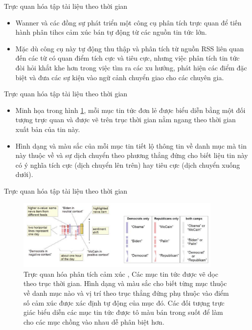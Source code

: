 \documentclass[10pt]{beamer}
\theoremstyle{remark}
\theoremstyle{definition}
\begin{document}
\begin{frame}{Trực quan hóa tập tài liệu theo thời gian}
	\begin{itemize}
		\item Wanner và các đồng sự phát triển một công cụ phân tích trực quan để tiến hành phân tihcs cảm xúc bán tự động từ các nguồn tin tức lớn.
		\item Mặc dù công cụ này tự động thu thập và phân tích từ nguồn RSS liên quan đến các từ có quan điểm tích cực và tiêu cực, nhưng việc phân tích tin tức đòi hỏi khắt khe hơn trong việc tìm ra các xu hướng, phát hiện các điểm đặc biệt và đưa các sự kiện vào ngữ cảnh chuyển giao cho các chuyên gia.
	\end{itemize}
\end{frame}

\begin{frame}{Trực quan hóa tập tài liệu theo thời gian}
	\begin{itemize}
		\item Minh họa trong hình \ref{fig:17}, mỗi mục tin tức đơn lẻ được biểu diễn bằng một đối tượng trực quan và được vẽ trên trục thời gian nằm ngang theo thời gian xuất bản của tin này.
		\item Hình dạng và màu sắc của mỗi mục tin tiết lộ thông tin về danh mục mà tin này thuộc về và sự dịch chuyển theo phương thẳng đứng cho biết liệu tin này có ý nghĩa tích cực (dịch chuyển lên trên) hay tiêu cực (dịch chuyển xuống dưới).
	\end{itemize}
\end{frame}

\begin{frame}{Trực quan hóa tập tài liệu theo thời gian}
	\begin{figure}[h!]
        \centering
        \includegraphics[width=0.9\textwidth]{17.png}
        \caption{Trực quan hóa phân tích cảm xúc \cite{440},
        Các mục tin tức được vẽ dọc theo trục thời gian.
        Hình dạng và màu sắc cho biết từng mục thuộc về danh mục nào và vị trí theo trục thẳng đứng phụ thuộc vào điểm số cảm xúc được xác định tự động của mục đó.
        Các đối tượng trực giác biểu diễn các mục tin tức được tô màu bán trong suốt để làm cho các mục chồng vào nhau dễ phân biệt hơn.}
        \label{fig:17}
    \end{figure}
\end{frame}
\end{document}
